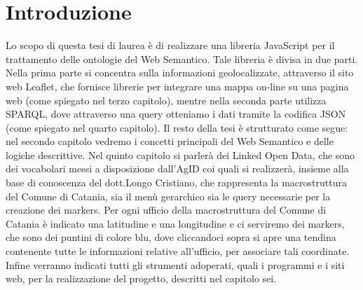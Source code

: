 \documentclass[a4paper,11pt]{article}
\begin{document}
\tableofcontents
\newpage

\section{Introduzione}
Lo scopo di questa tesi di laurea è di realizzare una libreria JavaScript per il trattamento delle ontologie del Web Semantico.
Tale libreria è divisa in due parti. Nella prima parte si concentra sulla informazioni geolocalizzate, attraverso il sito web Leaflet, che fornisce librerie per integrare una mappa on-line su una pagina web (come spiegato nel terzo capitolo), mentre nella seconda parte utilizza SPARQL, dove attraverso una query otteniamo i dati tramite la codifica JSON (come spiegato nel quarto capitolo). 
Il resto della tesi è strutturato come segue: nel secondo capitolo vedremo i concetti principali del Web Semantico e delle logiche descrittive. Nel quinto capitolo si parlerà  dei Linked Open Data, che sono dei vocabolari messi a disposizione dall'AgID coi quali si realizzerà, insieme alla base di conoscenza del dott.Longo Cristiano, che rappresenta la macrostruttura del Comune di Catania, sia il menù gerarchico sia le query necessarie per la creazione dei markers.
 Per ogni ufficio della macrostruttura del Comune di Catania è indicato una latitudine e una longitudine e ci serviremo dei markers, che sono dei puntini di colore blu, dove cliccandoci sopra si apre una tendina contenente tutte le informazioni relative all'ufficio, per associare tali coordinate. 
Infine verranno indicati tutti gli strumenti adoperati, quali i programmi e i siti web, per la realizzazione del progetto, descritti nel capitolo sei. 



\newpage
\end{document}
